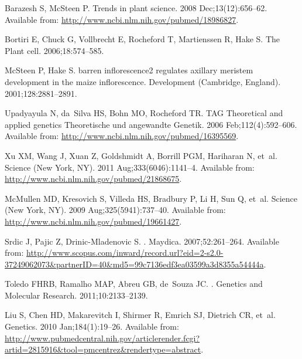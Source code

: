 \documentclass[10pt,letterpaper]{article}
\begin{document}
\begin{thebibliography}{}
Barazesh S, McSteen P.
\newblock Trends in plant science. 2008 Dec;13(12):656--62.
\newblock Available from: \url{http://www.ncbi.nlm.nih.gov/pubmed/18986827}.

Bortiri E, Chuck G, Vollbrecht E, Rocheford T, Martienssen R, Hake S.
\newblock The Plant cell. 2006;18:574--585.

McSteen P, Hake S.
\newblock barren inflorescence2 regulates axillary meristem development in the
  maize inflorescence.
\newblock Development (Cambridge, England). 2001;128:2881--2891.

Upadyayula N, da~Silva HS, Bohn MO, Rocheford TR.
\newblock TAG Theoretical and applied genetics Theoretische und angewandte
  Genetik. 2006 Feb;112(4):592--606.
\newblock Available from: \url{http://www.ncbi.nlm.nih.gov/pubmed/16395569}.

Xu XM, Wang J, Xuan Z, Goldshmidt A, Borrill PGM, Hariharan N, et~al.
\newblock Science (New York, NY). 2011 Aug;333(6046):1141--4.
\newblock Available from: \url{http://www.ncbi.nlm.nih.gov/pubmed/21868675}.

McMullen MD, Kresovich S, Villeda HS, Bradbury P, Li H, Sun Q, et~al.
\newblock Science (New York, NY). 2009 Aug;325(5941):737--40.
\newblock Available from: \url{http://www.ncbi.nlm.nih.gov/pubmed/19661427}.

Srdic J, Pajic Z, Drinic-Mladenovic S.
.
\newblock Maydica. 2007;52:261--264.
\newblock Available from:
  \url{http://www.scopus.com/inward/record.url?eid=2-s2.0-37249062073\&partnerID=40\&md5=99c7136edf3ea03599a3d8355a54444a}.

Toledo FHRB, Ramalho MAP, Abreu GB, de~Souza JC.
.
\newblock Genetics and Molecular Research. 2011;10:2133--2139.

Liu S, Chen HD, Makarevitch I, Shirmer R, Emrich SJ, Dietrich CR, et~al.
\newblock Genetics. 2010 Jan;184(1):19--26.
\newblock Available from:
  \url{http://www.pubmedcentral.nih.gov/articlerender.fcgi?artid=2815916\&tool=pmcentrez\&rendertype=abstract}.


\end{thebibliography}
\end{document}
